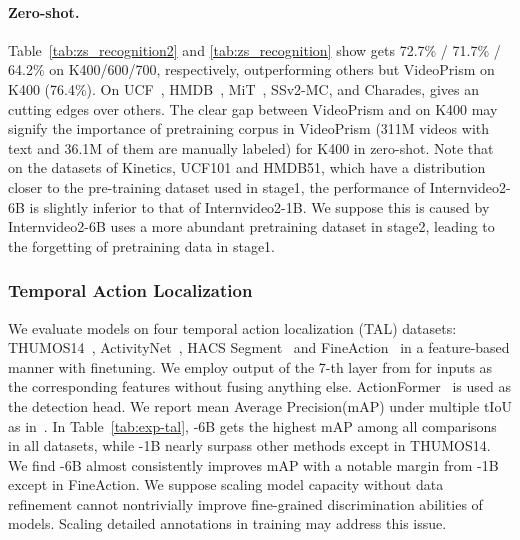 


\paragraph{Zero-shot.} Table~\ref{tab:zs_recognition2} and \ref{tab:zs_recognition} show {\modelname} gets 72.7\% / 71.7\% / 64.2\% on K400/600/700, respectively, outperforming others but VideoPrism on K400 (76.4\%). On UCF~\cite{soomro2012ucf101}, HMDB~\cite{hmdb}, MiT~\cite{mit}, SSv2-MC, and Charades, {\modelname} gives an cutting edges over others. The clear gap between VideoPrism and {\modelname} on K400 may signify the importance of pretraining corpus in VideoPrism (311M videos with text and 36.1M of them are manually labeled) for K400 in zero-shot. Note that on the datasets of Kinetics, UCF101 and HMDB51, which have a distribution closer to the pre-training dataset used in stage1, the performance of Internvideo2-6B is slightly inferior to that of Internvideo2-1B. We suppose this is caused by Internvideo2-6B uses a more abundant pretraining dataset in stage2, leading to the forgetting of pretraining data in stage1.



\subsubsection{Temporal Action Localization} \label{sec:tal}
We evaluate models on four temporal action localization (TAL) datasets: THUMOS14~\cite{thumos}, ActivityNet~\cite{anet}, HACS Segment~\cite{hacs} and FineAction~\cite{liu2022fineaction} in a feature-based manner with finetuning. We employ output of the 7-th layer from {\modelname} for inputs as the corresponding features without fusing anything else. ActionFormer~\cite{didemo} is used as the detection head. We report mean Average Precision(mAP) under multiple tIoU as in~\cite{lin2019bmn,chen2022dcan,didemo,yang2023basictad}. In Table~\ref{tab:exp-tal}, {\modelname}-6B gets the highest mAP among all comparisons in all datasets, while {\modelname}-1B nearly surpass other methods except in THUMOS14. We find {\modelname}-6B almost consistently improves mAP with a notable margin from {\modelname}-1B except in FineAction. We suppose scaling model capacity without data refinement cannot nontrivially improve fine-grained discrimination abilities of models. Scaling detailed annotations in training may address this issue.

